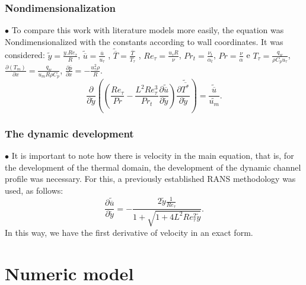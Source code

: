 \documentclass[xcolor=dvipsnames,8pt,aspectratio=34]{beamer}
\begin{document}
	
	
	
	
	
		\begin{frame}
			\frametitle{Nondimensionalization}
			$\bullet$ To compare this work with literature models more easily, the equation was Nondimensionalized with the constants according to wall coordinates. It was considered: $ \tilde{y} = \frac{y . Re_\tau}{R} $, $ \tilde{\overline{u}} = \frac{\overline{u}}{u_\tau} $ , $ \tilde{\overline{T}} = \frac{\overline{T}}{T_\tau} $ , $Re_\tau = \frac{u_\tau R}{\nu}$, $Pr_t = \frac{\nu_t}{\alpha_t}$, $Pr = \frac{\nu}{\alpha}$ e $T_\tau = \frac{q_w}{\rho C_p u_\tau}$, $\frac{\partial{\left(T_m\right)}}{\partial{x}} = \frac{q_w}{u_m  R \rho  C_p } $, $\frac{\partial \overline{p}}{\partial x} = - \frac{u_\tau^2 \rho}{R} $.
			\\
				\begin{equation}
				{\frac{\partial{}}{\partial{\tilde{y}}}} \left( \left( \frac{Re_\tau}{Pr}   
				- \frac{{L}^2 Re_\tau ^3}{Pr_t}\frac{\partial \tilde{\overline{u}}}{\partial \tilde{y}} \right) \frac{\partial \tilde{\overline{T^\ast}}}{\partial \tilde{y}} \right)
				= 
				\frac{\tilde{\overline{u}}}{\tilde{u_m}}.
				\end{equation}
		\end{frame}
	
	
	
		\begin{frame}
			\frametitle{The dynamic development}
			$\bullet$ 
			It is important to note how there is velocity in the main equation, that is, for the development of the thermal domain, the development of the dynamic channel profile was necessary. For this, a previously established RANS methodology was used, as follows:
				\begin{equation}
				\frac{\partial \tilde{\overline{u}}}{\partial \tilde{y}} = - \frac{2 \tilde{y} \frac{1}{Re_\tau} }{ 1 + \sqrt{ 1 + 4 L ^2 Re_\tau ^2 \tilde{y}}}.
				\end{equation}		
			In this way, we have the first derivative of velocity in an exact form.
		\end{frame}
	
	

	
	
	\section{Numeric model}
		
	
	
	
		
\end{document}
